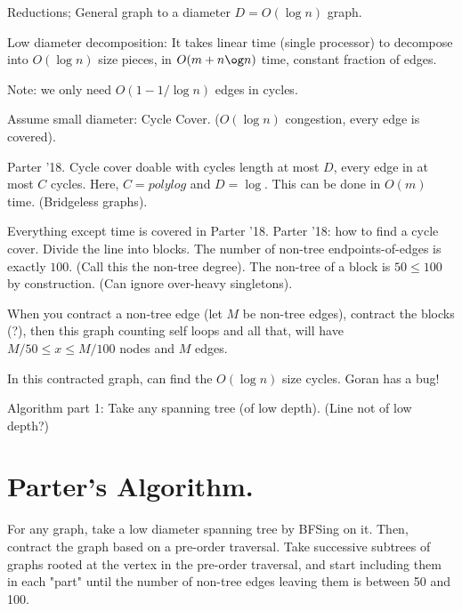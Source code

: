 

Reductions; General graph to a diameter $ D = O(\log n)$ graph.

\begin{theorem}
  Low diameter decomposition: It takes linear time (single
  processor) to decompose into $O(\log n)$ size pieces, in $O(m + n\og
  n)$ time, constant fraction of edges.
\end{theorem}

Note: we only need $O(1 - 1/\log n)$ edges in cycles.

Assume small diameter: Cycle Cover. ($O(\log n)$ congestion, every edge
is covered).

\begin{theorem} Parter '18. Cycle cover doable with cycles length at
  most $D$, every edge in at most $C$ cycles. Here, $C = polylog$ and $D
  = \log$. This can be done in $O(m)$ time. (Bridgeless graphs).
\end{theorem}

Everything except time is covered in Parter '18. 
Parter '18: how to find a cycle cover. Divide the line into blocks. The
number of non-tree endpoints-of-edges is exactly $100$.  (Call this the
non-tree degree). The non-tree of a block is $50 \leq 100$ by
construction. (Can ignore over-heavy singletons).

When you contract a non-tree edge (let $M$ be non-tree edges), contract
the blocks (?), then this graph counting self loops and all that, will
have $M /50 \leq x \leq M / 100$ nodes and $M$ edges.

In this contracted graph, can find the $O(\log n)$ size cycles. Goran
has a bug!

Algorithm part 1: Take any spanning tree (of low depth). (Line not of
low depth?)

\section{Parter's Algorithm.}
For any graph, take a low diameter spanning tree by BFSing on it. Then,
contract the graph based on a pre-order traversal. Take successive
subtrees of graphs rooted at the vertex in the pre-order traversal, and
start including them in each "part" until the number of non-tree edges
leaving them is between 50 and 100.


